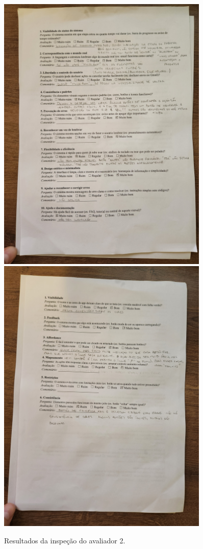 \begin{figure}[H]
    \centering
    \includegraphics[width=0.9\textwidth]{sections/appendix/resultados_inspecao_usabilidade/2 (1).jpg}
    \includegraphics[width=0.9\textwidth]{sections/appendix/resultados_inspecao_usabilidade/2 (2).jpg}
    \caption{Resultados da inspeção do avaliador 2.}
\end{figure}

